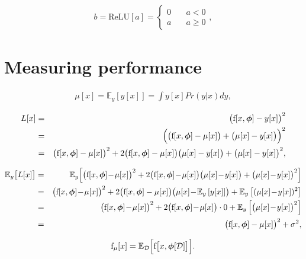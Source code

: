 \documentclass[letterpaper,twoside,openany, titlepage,oldfontcommands,titles,dvipsnames]{memoir}
\begin{document}
\begin{eqnarray}
 b = \mbox{ReLU}[a] = \begin{cases} 0 & \quad a <0 \\ a& \quad a\geq 0\end{cases},
 \end{eqnarray}

\chapter{Measuring performance}

\begin{eqnarray}
  \mu[x] = \mathbb{E}_{y}[y[x]] = \int y[x] Pr(y|x) dy,
 \end{eqnarray}

\begin{eqnarray}
  L[x] &=& \bigl(\mbox{f}[x,\boldsymbol\phi]-y[x]\bigr)^2 \\
  &=& \Bigl(\bigl(\mbox{f}[x,\boldsymbol\phi]-\mu[x]\bigr)+\bigl(\mu[x]-y[x]\bigr)\Bigr)^2\nonumber \\
  &=& \bigl(\mbox{f}[x,\boldsymbol\phi]-\mu[x]\bigr)^2 + 2\bigl(\mbox{f}[x,\boldsymbol\phi]-\mu[x]\bigr)\bigl(\mu[x]-y[x]\bigr) + \bigl(\mu[x]-y[x]\bigr)^2,\nonumber
 \end{eqnarray}

\begin{eqnarray}\label{eq:perf_biasvariance_plus_noise}
  \mathbb{E}_{y}\bigl[L[x]\bigr]
  &=&\mathbb{E}_{y}\Bigl[\bigl(\mbox{f}[x,\boldsymbol\phi]\!-\!\mu[x]\bigr)^2+2\bigl(\mbox{f}[x,\boldsymbol\phi]\!-\!\mu[x]\bigr)\bigl(\mu[x]\!-\!y[x]\bigr)+\bigl(\mu[x]\!-\!y[x]\bigr)^2\Bigr]\nonumber \\
  &=& \bigl(\mbox{f}[x,\boldsymbol\phi]\!-\!\mu[x]\bigr)^2+2\bigl(\mbox{f}[x,\boldsymbol\phi]-\mu[x]\bigr)\bigl(\mu[x]\!-\!\mathbb{E}_y\left[y[x]\right]\bigr)+\mathbb{E}_y\left[(\mu[x]\!-\!y[x])^2\right]\nonumber\\ 
  &=&\bigl(\mbox{f}[x,\boldsymbol\phi]\!-\!\mu[x]\bigr)^2+2\bigl(\mbox{f}[x,\boldsymbol\phi]\!-\!\mu[x]\bigr)\cdot 0 +\mathbb{E}_y\left[\bigl(\mu[x]\!-\!y[x]\bigr)^2\right]\nonumber \\
  &=&\bigl(\mbox{f}[x,\boldsymbol\phi]-\mu[x]\bigr)^2+\sigma^{2},
 \end{eqnarray}

\begin{eqnarray}
  \mbox{f}_{\mu}[x] = \mathbb{E}_{\mathcal{D}}\Bigl[ \mbox{f}\bigl[x,\boldsymbol\phi[\mathcal{D}]\bigr] \Bigr].
 \end{eqnarray}
\end{document}
